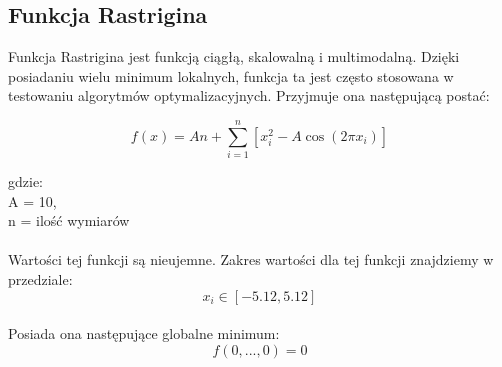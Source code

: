 \documentclass[twoside]{projektInzynierskiMS1}
\newcommand{\newLine}{~\\}
\newcommand{\si}{ś}
\begin{document}
	\subsection{Funkcja Rastrigina}
	Funkcja Rastrigina jest funkcją ciągłą, skalowalną i multimodalną. Dzięki posiadaniu wielu minimum lokalnych, funkcja ta jest często stosowana w testowaniu algorytmów optymalizacyjnych. Przyjmuje ona następującą postać:

\[f(x) = An + \sum_{i=1}^{n} [x_i^2 - A \cos{(2 \pi x_i)}] \]

gdzie: \\
A = 10, \\
n = ilo\si ć wymiarów \\ \newLine

Warto\si ci tej funkcji są nieujemne. Zakres warto\si ci dla tej funkcji znajdziemy w przedziale:
\[x_i \in [-5.12, 5.12] \] \\

Posiada ona następujące globalne minimum:
\[ f(0,...,0) = 0 \] \\
\end{document}
